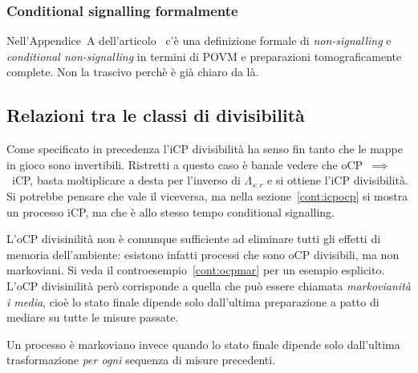 \documentclass[a4]{article}
\begin{document}
\subsubsection{Conditional signalling formalmente}
Nell'Appendice~A dell'articolo~\cite{CPdoesnotimply} c'è una definizione formale di
\emph{non-signalling} e \emph{conditional non-signalling} in termini di POVM e preparazioni
tomograficamente complete. Non la trascivo perchè è già chiaro da là.

\subsection{Relazioni tra le classi di divisibilità}
Come specificato in precedenza l'iCP divisibilità ha senso fin tanto che le mappe in gioco
sono invertibili. Ristretti a questo caso è banale vedere che oCP~\(\implies\)~iCP, basta 
moltiplicare a desta per l'inverso di \(\Lambda_{s\colon r}\) e si ottiene l'iCP divisibilità.
Si potrebbe pensare che vale il viceversa, ma nella sezione~\ref{cont:icpocp} si mostra
un processo iCP, ma che è allo stesso tempo conditional signalling.

L'oCP divisinilità non è comunque sufficiente ad eliminare tutti gli effetti di memoria
dell'ambiente: esistono infatti processi che sono oCP divisibili, ma non markoviani.
Si veda il controesempio~\ref{cont:ocpmar} per un esempio esplicito.
L'oCP divisinilità però corrisponde a quella che può essere chiamata \emph{markovianità
i media}, cioè lo stato finale dipende solo dall'ultima preparazione a patto di mediare
su tutte le misure passate.


Un processo è markoviano invece quando lo stato finale dipende solo dall'ultima trasformazione
\emph{per ogni} sequenza di misure precedenti.
\end{document}
